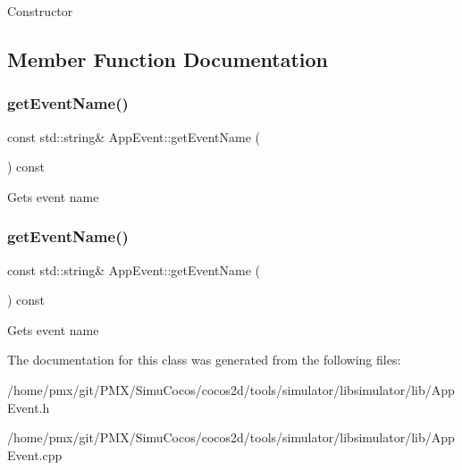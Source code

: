 Constructor 

\subsection{Member Function Documentation}
\mbox{\label{classAppEvent_accc9f3c863e33ebf227f251eb18a96e8}} 
\subsubsection{\texorpdfstring{get\+Event\+Name()}{getEventName()}\hspace{0.1cm}{\footnotesize\ttfamily [1/2]}}
{\footnotesize\ttfamily const std\+::string\& App\+Event\+::get\+Event\+Name (\begin{DoxyParamCaption}{ }\end{DoxyParamCaption}) const\hspace{0.3cm}{\ttfamily [inline]}}

Gets event name \mbox{\label{classAppEvent_accc9f3c863e33ebf227f251eb18a96e8}} 
\subsubsection{\texorpdfstring{get\+Event\+Name()}{getEventName()}\hspace{0.1cm}{\footnotesize\ttfamily [2/2]}}
{\footnotesize\ttfamily const std\+::string\& App\+Event\+::get\+Event\+Name (\begin{DoxyParamCaption}{ }\end{DoxyParamCaption}) const\hspace{0.3cm}{\ttfamily [inline]}}

Gets event name 

The documentation for this class was generated from the following files\+:\begin{DoxyCompactItemize}
\item 
/home/pmx/git/\+P\+M\+X/\+Simu\+Cocos/cocos2d/tools/simulator/libsimulator/lib/App\+Event.\+h\item 
/home/pmx/git/\+P\+M\+X/\+Simu\+Cocos/cocos2d/tools/simulator/libsimulator/lib/App\+Event.\+cpp\end{DoxyCompactItemize}
